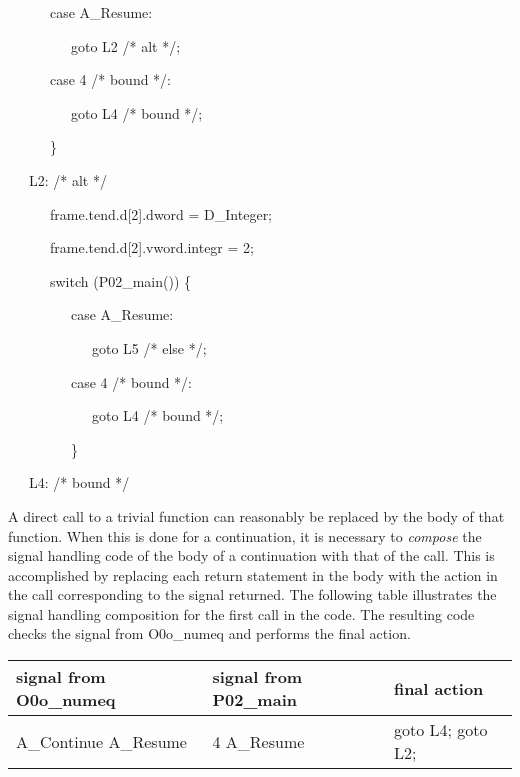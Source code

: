 {\ttfamily\mdseries
\ \ \ \ \ \ case A\_Resume:}

{\ttfamily\mdseries
\ \ \ \ \ \ \ \ \ goto L2 /* alt */;}

{\ttfamily\mdseries
\ \ \ \ \ \ case 4 /* bound */:}

{\ttfamily\mdseries
\ \ \ \ \ \ \ \ \ goto L4 /* bound */;}

{\ttfamily\mdseries
\ \ \ \ \ \ \}}

{\ttfamily\mdseries
\ \ \ L2: /* alt */}

{\ttfamily\mdseries
\ \ \ \ \ \ frame.tend.d[2].dword = D\_Integer;}

{\ttfamily\mdseries
\ \ \ \ \ \ frame.tend.d[2].vword.integr = 2;}

{\ttfamily\mdseries
\ \ \ \ \ \ switch (P02\_main()) \{}

{\ttfamily\mdseries
\ \ \ \ \ \ \ \ \ case A\_Resume:}

{\ttfamily\mdseries
\ \ \ \ \ \ \ \ \ \ \ \ goto L5 /* else */;}

{\ttfamily\mdseries
\ \ \ \ \ \ \ \ \ case 4 /* bound */:}

{\ttfamily\mdseries
\ \ \ \ \ \ \ \ \ \ \ \ goto L4 /* bound */;}

{\ttfamily\mdseries
\ \ \ \ \ \ \ \ \ \}}

{\ttfamily\mdseries
\ \ \ L4: /* bound */}


A direct call to a trivial function can reasonably be replaced by the
body of that function. When this is done for a continuation, it is
necessary to \textit{compose} the signal handling code of the body of
a continuation with that of the call. This is accomplished by
replacing each return statement in the body with the action in the
call corresponding to the signal returned. The following table
illustrates the signal handling composition for the first call in the
code.  The resulting code checks the signal from O0o\_numeq and
performs the final action.

\begin{center}
\tablefirsthead{}
\tablehead{}
\tabletail{}
\tablelasttail{}
\begin{supertabular}{|m{1.7879599in}|m{1.6031599in}|m{1.0469599in}|}
\hline
 signal from O0o\_numeq  &
 signal from P02\_main  &
 final action \\\hline
 A\_Continue\newline
A\_Resume  &
 4\newline
A\_Resume  &
 goto L4;\newline
goto L2; \\\hline
\end{supertabular}
\end{center}

